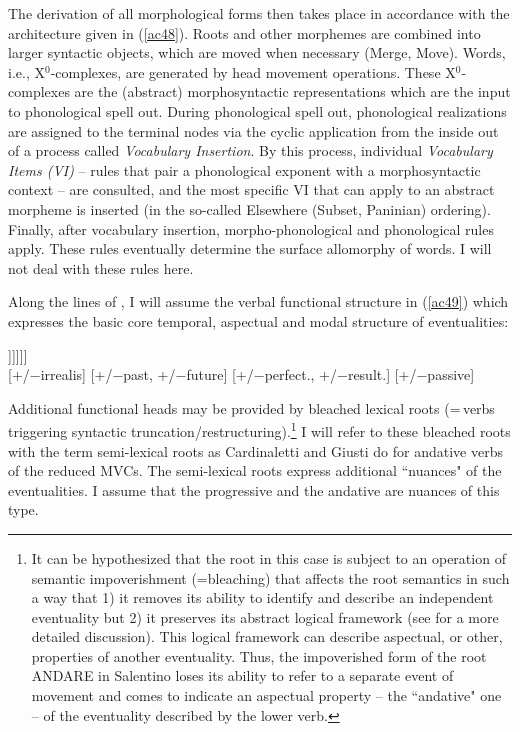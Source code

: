 \documentclass[output=paper]{langscibook}
\begin{document}
The derivation of all morphological forms then takes place in accordance with the architecture given in (\ref{ac48}). Roots and other morphemes are combined into larger syntactic objects, which are moved when necessary (Merge, Move). Words, i.e., X$^0$-complexes, are generated by head movement operations. These X$^0$-complexes are the (abstract) morphosyntactic representations which are the input to phonological spell out.  During phonological spell out, phonological realizations are assigned to the terminal nodes via the cyclic application from the inside out of a process called \textit{Vocabulary Insertion}. By this process, individual \textit{Vocabulary Items (VI)}  --  rules that pair a phonological exponent with a morphosyntactic context -- are consulted, and the most specific VI that can apply to an abstract morpheme is inserted (in the so-called Elsewhere (Subset, Paninian) ordering).  Finally, after vocabulary insertion, morpho-phonological and phonological rules apply.  These rules eventually determine the surface allomorphy of words.  I will not deal with these rules here.

Along the lines of \citet{wurmbrand2015}, I will assume the verbal functional structure in (\ref{ac49}) which expresses the basic core temporal, aspectual and modal structure of eventualities:

\ea \label{ac49}
\gll [\textsubscript{MoodP} Mood$^0$ [\textsubscript{TenseP} T$^0$ [\textsubscript{AspP} Asp$^0$ [\textsubscript{VoiceP} Voice$^0$ [\textsubscript{vP} v$^0$ [\textsubscript{√p} √Root$^0$ ]]]]]]\\
     {} [+/−irrealis] {} {[+/−past, +/−future]} {}  {[+/−perfect., +/−result.]} {} [+/−passive] {} {} {} {} {}\\
\z

Additional functional heads may be provided by bleached lexical roots (=\,verbs triggering syntactic truncation\slash restructuring).\footnote{It can be hypothesized that the root in this case is subject to an operation of semantic impoverishment (=bleaching) that affects the root semantics in such a way that 1) it removes its ability to identify and describe an independent eventuality but 2) it preserves its abstract logical framework (see \citealt{roberts2010a} for a more detailed discussion).  This logical framework can describe aspectual, or other, properties of another eventuality.  Thus, the impoverished form of the root ANDARE in Salentino loses its ability to refer to a separate event of movement and comes to indicate an aspectual property -- the “andative" one -- of the eventuality described by the lower verb.}  I will refer to these bleached roots with the term semi-lexical roots as Cardinaletti and Giusti do for andative verbs of the reduced MVCs. The semi-lexical roots express additional ``nuances" of the eventualities.   I assume that the progressive and the andative are nuances of this type.
\end{document}
